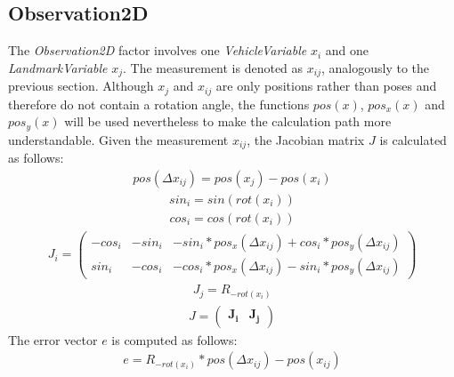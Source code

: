 \subsection{Observation2D}
The \textit{Observation2D} factor involves one \textit{VehicleVariable} $x_i$ and one \textit{LandmarkVariable} $x_j$. The measurement is denoted as $x_{ij}$, analogously to the previous section. Although $x_j$ and $x_{ij}$ are only positions rather than poses and therefore do not contain a rotation angle, the functions $pos(x)$, $pos_x(x)$ and $pos_y(x)$ will be used nevertheless to make the calculation path more understandable. Given the measurement $x_{ij}$, the Jacobian matrix $J$ is calculated as follows:
\begin{align}
	pos(\Delta x_{ij}) = pos(x_j) - pos(x_i)
\end{align}
\begin{align}
	sin_i = sin(rot(x_i))
\end{align}
\begin{align}
	cos_i = cos(rot(x_i))
\end{align}
\begin{align}
	J_i =
	\begin{pmatrix}
		-cos_i & -sin_i & -sin_i*pos_x(\Delta x_{ij}) + cos_i*pos_y(\Delta x_{ij})\\
		 sin_i & -cos_i & -cos_i*pos_x(\Delta x_{ij}) - sin_i*pos_y(\Delta x_{ij})
	\end{pmatrix}
\end{align}
\begin{align}
	J_j = R_{-rot(x_i)}
\end{align}
\begin{align}
	J =
	\begin{pmatrix}
		\boldsymbol{J_i} & \boldsymbol{J_j}
	\end{pmatrix}
\end{align}
The error vector $e$ is computed as follows:
\begin{align}
	e = R_{-rot(x_i)} * pos(\Delta x_{ij}) - pos(x_{ij})
\end{align}